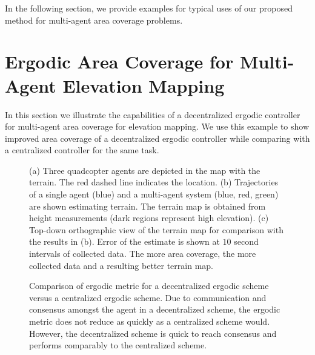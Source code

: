 \documentclass[letterpaper, 10 pt, conference]{ieeeconf}  %
\begin{document}
In the following section, we provide examples for typical uses of our proposed method for multi-agent area coverage problems.


\section{Ergodic Area Coverage for Multi-Agent Elevation Mapping}
\label{sec:terrain-mapping-using-ergodic-area-coverage}
In this section we illustrate the capabilities of a decentralized ergodic controller for multi-agent area coverage for elevation mapping.
We use this example to show improved area coverage of a decentralized ergodic controller while comparing with a centralized controller for the same task.

\begin{figure}[thpb]
\centering
{}
\caption{
(a) Three quadcopter agents are depicted in the map with the terrain. The red dashed line indicates the location.
(b) Trajectories of a single agent (blue) and a multi-agent system (blue, red, green) are shown estimating terrain. The terrain map is obtained from height measurements (dark regions represent high elevation).
(c) Top-down orthographic view of the terrain map for comparison with the results in (b). 
Error of the estimate is shown at $10$ second intervals of collected data. The more area coverage, the more collected data and a resulting better terrain map.}
\label{fig:mapping_results}
\end{figure}

\begin{figure}[thpb]
\centering
{}
\caption{Comparison of ergodic metric for a decentralized ergodic scheme versus a centralized ergodic scheme. 
Due to communication and consensus amongst the agent in a decentralized scheme, the ergodic metric does not reduce as quickly as a centralized scheme would.
However, the decentralized scheme is quick to reach consensus and performs comparably to the centralized scheme.}
\label{fig:coverage_comparison}
\end{figure}
\end{document}
